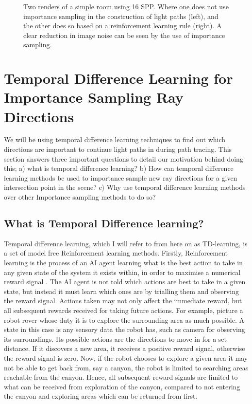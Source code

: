 \documentclass[../dissertation.tex]{subfiles}
\begin{document}
\begin{figure}[h]
\begin{minipage}{.45\textwidth}
\end{minipage}
\caption{Two renders of a simple room using 16 SPP. Where one does not use importance sampling in the construction of light paths (left), and the other does so based on a reinforcement learning rule \cite{dahm2017learning} (right). A clear reduction in image noise can be seen by the use of importance sampling.}
\label{fig:noise_reduction_simple_room}
\end{figure}

\section{Temporal Difference Learning for Importance Sampling Ray Directions}
\label{sec:td_learn_for_importance}

We will be using temporal difference learning techniques to find out which directions are important to continue light paths in during path tracing. This section answers three important questions to detail our motivation behind doing this; a) what is temporal difference learning?  b) How can temporal difference learning methods be used to importance sample new ray directions for a given intersection point in the scene? c) Why use temporal difference learning methods over other Importance sampling methods to do so? 

\subsection{What is Temporal Difference learning?}
Temporal difference learning, which I will refer to from here on as TD-learning, is a set of model free Reinforcement learning methods. Firstly, Reinforcement learning is the process of an AI agent learning what is the best action to take in any given state of the system it exists within, in order to maximise a numerical reward signal \cite{sutton2011reinforcement}. The AI agent is not told which actions are  best to take in a given state, but instead it must learn which ones are by trialling them and observing the reward signal. Actions taken may not only affect the immediate reward, but all subsequent rewards received for taking future actions. For example, picture a robot rover whose duty it is to explore the surrounding area as much possible. A state in this case is any sensory data the robot has, such as camera for observing its surroundings. Its possible actions are the directions to move in for a set distance. If it discovers a new area, it receives a positive reward signal, otherwise the reward signal is zero. Now, if the robot chooses to explore a given area it may not be able to get back from, say a canyon, the robot is limited to searching areas reachable from the canyon. Hence, all subsequent reward signals are limited to what can be received from exploration of the canyon, compared to not entering the canyon and exploring areas which can be returned from first.
\end{document}
